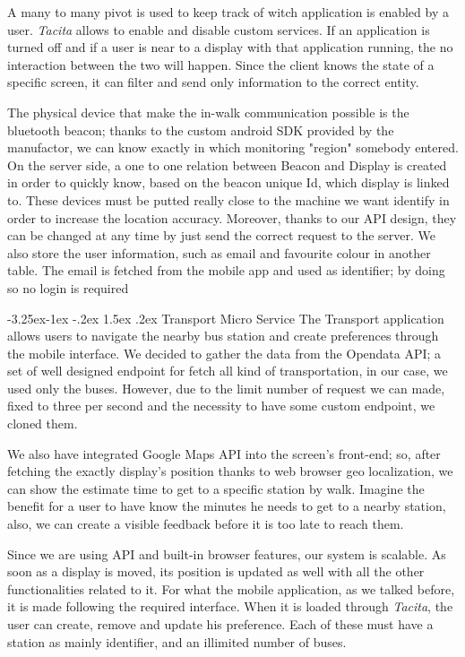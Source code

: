 \documentclass[]{usiinfbachelorproject}
\makeatletter
\newcommand\subsubsection{\@startsection{subsubsection}{3}{\z@}%
                {-3.25ex\@plus -1ex \@minus -.2ex}%
                {1.5ex \@plus .2ex}%
                {\normalfont\normalsize\bfseries}}
\makeatother
\begin{document}
A many to many pivot is used to keep track of witch application is enabled by a user. \emph{Tacita} allows to enable and disable custom services. If an application is turned off  and if a user is near to a display with that application running, the no interaction between the two will happen. Since the client knows the state of a specific screen, it can filter and send only information to the correct entity.

The physical device that make the in-walk communication possible is the bluetooth beacon; thanks to the custom android SDK provided by the manufactor, we can know exactly in which monitoring "region" somebody entered. On the server side, a one to one relation between Beacon and Display is created in order to quickly know, based on the beacon unique Id, which display is linked to. These devices must be putted really close to the machine we want identify in order to increase the location accuracy. Moreover, thanks to our API design, they can be changed at any time by just send the correct request to the server.
We also store the user information, such as email and favourite colour in another table. The email is fetched from the mobile app and used as identifier; by doing so no login is required 

\subsubsection{Transport Micro Service}
The Transport application allows users to navigate the nearby bus station and create preferences through the mobile interface. We decided to gather the data from the Opendata API; a set of well designed endpoint for fetch all kind of transportation, in our case, we used only the buses. However, due to the limit number of request we can made, fixed to three per second and the necessity to have some custom endpoint, we cloned them.

We also have integrated Google Maps API into the screen's front-end; so, after fetching the exactly display's position thanks to web browser geo localization, we can show the estimate time to get to a specific station by walk. Imagine the benefit for a user to have know the minutes he needs to get to a nearby station, also, we can create a visible feedback before it is too late to reach them.

Since we are using API and built-in browser features, our system is scalable. As soon as a display is moved, its position is updated as well with all the other functionalities related to it.
For what the mobile application, as we talked before, it is made following the required interface. When it is loaded through \emph{Tacita}, the user can create, remove and update his preference. Each of these must have a station as mainly identifier, and an illimited number of buses.
\end{document}
